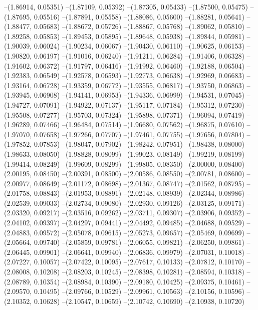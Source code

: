 --(1.86914, 0.05351)
--(1.87109, 0.05392)
--(1.87305, 0.05433)
--(1.87500, 0.05475)
--(1.87695, 0.05516)
--(1.87891, 0.05558)
--(1.88086, 0.05600)
--(1.88281, 0.05641)
--(1.88477, 0.05683)
--(1.88672, 0.05726)
--(1.88867, 0.05768)
--(1.89062, 0.05810)
--(1.89258, 0.05853)
--(1.89453, 0.05895)
--(1.89648, 0.05938)
--(1.89844, 0.05981)
--(1.90039, 0.06024)
--(1.90234, 0.06067)
--(1.90430, 0.06110)
--(1.90625, 0.06153)
--(1.90820, 0.06197)
--(1.91016, 0.06240)
--(1.91211, 0.06284)
--(1.91406, 0.06328)
--(1.91602, 0.06372)
--(1.91797, 0.06416)
--(1.91992, 0.06460)
--(1.92188, 0.06504)
--(1.92383, 0.06549)
--(1.92578, 0.06593)
--(1.92773, 0.06638)
--(1.92969, 0.06683)
--(1.93164, 0.06728)
--(1.93359, 0.06772)
--(1.93555, 0.06817)
--(1.93750, 0.06863)
--(1.93945, 0.06908)
--(1.94141, 0.06953)
--(1.94336, 0.06999)
--(1.94531, 0.07045)
--(1.94727, 0.07091)
--(1.94922, 0.07137)
--(1.95117, 0.07184)
--(1.95312, 0.07230)
--(1.95508, 0.07277)
--(1.95703, 0.07324)
--(1.95898, 0.07371)
--(1.96094, 0.07419)
--(1.96289, 0.07466)
--(1.96484, 0.07514)
--(1.96680, 0.07562)
--(1.96875, 0.07610)
--(1.97070, 0.07658)
--(1.97266, 0.07707)
--(1.97461, 0.07755)
--(1.97656, 0.07804)
--(1.97852, 0.07853)
--(1.98047, 0.07902)
--(1.98242, 0.07951)
--(1.98438, 0.08000)
--(1.98633, 0.08050)
--(1.98828, 0.08099)
--(1.99023, 0.08149)
--(1.99219, 0.08199)
--(1.99414, 0.08249)
--(1.99609, 0.08299)
--(1.99805, 0.08350)
--(2.00000, 0.08400)
--(2.00195, 0.08450)
--(2.00391, 0.08500)
--(2.00586, 0.08550)
--(2.00781, 0.08600)
--(2.00977, 0.08649)
--(2.01172, 0.08698)
--(2.01367, 0.08747)
--(2.01562, 0.08795)
--(2.01758, 0.08843)
--(2.01953, 0.08891)
--(2.02148, 0.08939)
--(2.02344, 0.08986)
--(2.02539, 0.09033)
--(2.02734, 0.09080)
--(2.02930, 0.09126)
--(2.03125, 0.09171)
--(2.03320, 0.09217)
--(2.03516, 0.09262)
--(2.03711, 0.09307)
--(2.03906, 0.09352)
--(2.04102, 0.09397)
--(2.04297, 0.09441)
--(2.04492, 0.09485)
--(2.04688, 0.09529)
--(2.04883, 0.09572)
--(2.05078, 0.09615)
--(2.05273, 0.09657)
--(2.05469, 0.09699)
--(2.05664, 0.09740)
--(2.05859, 0.09781)
--(2.06055, 0.09821)
--(2.06250, 0.09861)
--(2.06445, 0.09901)
--(2.06641, 0.09940)
--(2.06836, 0.09979)
--(2.07031, 0.10018)
--(2.07227, 0.10057)
--(2.07422, 0.10095)
--(2.07617, 0.10133)
--(2.07812, 0.10170)
--(2.08008, 0.10208)
--(2.08203, 0.10245)
--(2.08398, 0.10281)
--(2.08594, 0.10318)
--(2.08789, 0.10354)
--(2.08984, 0.10390)
--(2.09180, 0.10425)
--(2.09375, 0.10461)
--(2.09570, 0.10495)
--(2.09766, 0.10529)
--(2.09961, 0.10563)
--(2.10156, 0.10596)
--(2.10352, 0.10628)
--(2.10547, 0.10659)
--(2.10742, 0.10690)
--(2.10938, 0.10720)
